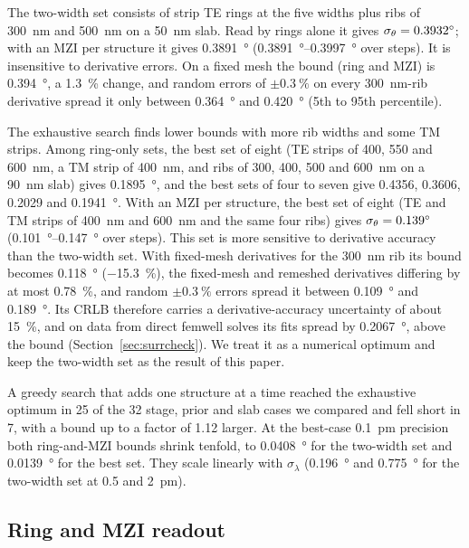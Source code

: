 The two-width set consists of strip TE rings at the five widths plus ribs of \qty{300}{nm} and \qty{500}{nm} on a
\qty{50}{nm} slab. Read by rings alone it gives $\sigma_\theta=\qty{0.3932}{\degree}$; with an MZI per structure it gives
\qty{0.3891}{\degree} (\qtyrange{0.3891}{0.3997}{\degree} over steps). It is insensitive to derivative errors. On a
fixed mesh the bound (ring and MZI) is \qty{0.394}{\degree}, a \qty{1.3}{\percent} change, and random errors of
$\pm\qty{0.3}{\percent}$ on every \qty{300}{nm}-rib derivative spread it only between \qty{0.364}{\degree} and
\qty{0.420}{\degree} (5th to 95th percentile).

The exhaustive search finds lower bounds with more rib widths and some TM strips. Among ring-only sets, the best set
of eight (TE strips of 400, 550 and \qty{600}{nm}, a TM strip of \qty{400}{nm}, and ribs of 300, 400, 500 and
\qty{600}{nm} on a \qty{90}{nm} slab) gives \qty{0.1895}{\degree}, and the best sets of four to seven give 0.4356,
0.3606, 0.2029 and \qty{0.1941}{\degree}. With an MZI per structure, the best set of eight (TE and TM strips of
\qty{400}{nm} and \qty{600}{nm} and the same four ribs) gives $\sigma_\theta=\qty{0.139}{\degree}$
(\qtyrange{0.101}{0.147}{\degree} over steps). This set is more sensitive to derivative accuracy than the two-width
set. With fixed-mesh derivatives for the \qty{300}{nm} rib its bound becomes \qty{0.118}{\degree}
(\qty{-15.3}{\percent}), the fixed-mesh and remeshed derivatives differing by at most \qty{0.78}{\percent}, and random
$\pm\qty{0.3}{\percent}$ errors spread it between \qty{0.109}{\degree} and \qty{0.189}{\degree}. Its CRLB therefore carries a
derivative-accuracy uncertainty of about \qty{15}{\percent}, and on data from direct femwell solves its fits spread by \qty{0.2067}{\degree}, above
the bound (Section~\ref{sec:surrcheck}). We treat it as a numerical optimum and keep the two-width set as the result of this paper.

A greedy search that adds one structure at a time reached the exhaustive optimum in 25 of the 32 stage, prior and slab
cases we compared and fell short in 7, with a bound up to a factor of 1.12 larger. At the best-case \qty{0.1}{pm}
precision both ring-and-MZI bounds shrink tenfold, to \qty{0.0408}{\degree} for the two-width set and
\qty{0.0139}{\degree} for the best set. They scale linearly with $\sigma_\lambda$ (\qty{0.196}{\degree} and
\qty{0.775}{\degree} for the two-width set at 0.5 and \qty{2}{pm}).

\subsection{Ring and MZI readout}
\label{sec:mzi}

